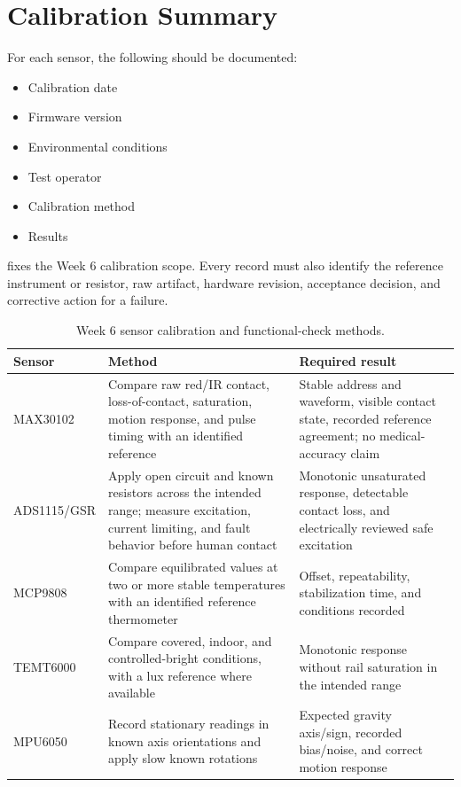 \section{Calibration Summary}
\label{sec:calibration-summary}

For each sensor, the following should be documented:
\begin{itemize}
    \item Calibration date
    \item Firmware version
    \item Environmental conditions
    \item Test operator
    \item Calibration method
    \item Results
\end{itemize}

 fixes the Week 6 calibration scope. Every record must also identify the reference instrument or resistor, raw artifact, hardware revision, acceptance decision, and corrective action for a failure.

\begin{table}[t]
\centering
\caption{Week 6 sensor calibration and functional-check methods.}
\label{tab:week6-calibration-methods}
\small
\begin{tabularx}{\textwidth}{@{}l Y Y@{}}
\toprule
\textbf{Sensor} & \textbf{Method} & \textbf{Required result} \\
\midrule
MAX30102 & Compare raw red/IR contact, loss-of-contact, saturation, motion response, and pulse timing with an identified reference & Stable address and waveform, visible contact state, recorded reference agreement; no medical-accuracy claim \\
ADS1115/GSR & Apply open circuit and known resistors across the intended range; measure excitation, current limiting, and fault behavior before human contact & Monotonic unsaturated response, detectable contact loss, and electrically reviewed safe excitation \\
MCP9808 & Compare equilibrated values at two or more stable temperatures with an identified reference thermometer & Offset, repeatability, stabilization time, and conditions recorded \\
TEMT6000 & Compare covered, indoor, and controlled-bright conditions, with a lux reference where available & Monotonic response without rail saturation in the intended range \\
MPU6050 & Record stationary readings in known axis orientations and apply slow known rotations & Expected gravity axis/sign, recorded bias/noise, and correct motion response \\
\bottomrule
\end{tabularx}
\end{table}

